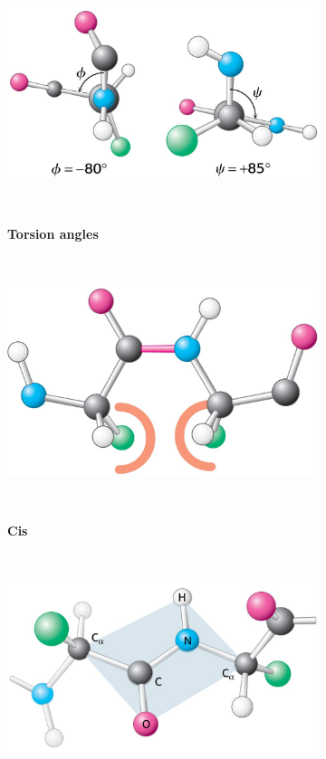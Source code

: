 ~\begin{figure}[h!]
	~\begin{subfigure}[b]{0.32\linewidth}
		\includegraphics[width=\linewidth]{./literature_review/proteins/secundary_structure/img/torsion_angles.jpg}
		\caption{\textbf{Torsion angles}}
		\label{fig:torsion_angles}
	~\end{subfigure}
	~\begin{subfigure}[b]{0.32\linewidth}
		\includegraphics[width=\linewidth]{./literature_review/proteins/secundary_structure/img/cis.jpg}
		\caption{\textbf{Cis}}
		\label{fig:cis}
	~\end{subfigure}
	~\begin{subfigure}[b]{0.32\linewidth}
		\includegraphics[width=\linewidth]{./literature_review/proteins/secundary_structure/img/trans_planar.jpg}

\end{subfigure}
\end{figure}

